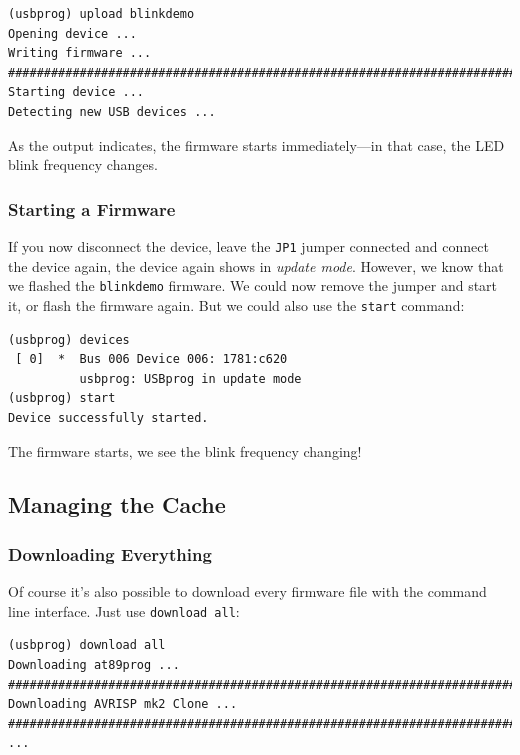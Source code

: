 \documentclass[bibtotoc,UKenglish,halfparskip,oneside,DIV12]{scrreprt}
\begin{document}
\begin{lstlisting}[style=inline]
(usbprog) upload blinkdemo 
Opening device ...
Writing firmware ...
###############################################################################
Starting device ...
Detecting new USB devices ...
\end{lstlisting}

As the output indicates, the firmware starts immediately---in that case, the LED blink frequency
changes.

\subsubsection{Starting a Firmware}

If you now disconnect the device, leave the \texttt{JP1} jumper connected and connect the
device again, the device again shows in \emph{update mode}. However, we know that we flashed the
\texttt{blinkdemo} firmware. We could now remove the jumper and start it, or flash the firmware
again. But we could also use the \texttt{start} command:

\begin{lstlisting}[style=inline]
(usbprog) devices
 [ 0]  *  Bus 006 Device 006: 1781:c620
          usbprog: USBprog in update mode
(usbprog) start
Device successfully started.
\end{lstlisting}

The firmware starts, we see the blink frequency changing!





\subsection{Managing the Cache}

\subsubsection{Downloading Everything}

Of course it's also possible to download every firmware file with the command line interface. Just
use \texttt{download all}:

\begin{lstlisting}[style=inline]
(usbprog) download all
Downloading at89prog ...
################################################################################
Downloading AVRISP mk2 Clone ...
################################################################################
...
\end{lstlisting}
\end{document}
